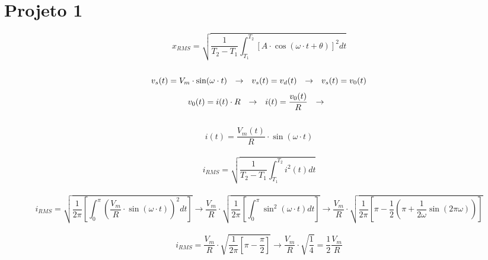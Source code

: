\documentclass{article}
\begin{document}
    \section{Projeto 1}
        \[
            x_{RMS} = \sqrt{\frac{1}{T_{2} - T_{1}} \int_{T_{1}}^{T_{2}} [A \cdot \cos(\omega\cdot t + \theta)]^{2} dt}
        \]\\
        \[
            v_{s}(t) = V_{m} \cdot \sin(\omega \cdot t) \hspace{2.5mm} \to \hspace{2.5mm}
            v_{s}(t) = v_{d}(t) \hspace{2.5mm} \to \hspace{2.5mm}
            v_{s}(t) = v_{0}(t)
        \]
        \[
            v_{0}(t) = i(t) \cdot R \hspace{2.5mm} \to \hspace{2.5mm}
            i(t) = \frac{v_{0}(t)}{R} \hspace{2.5mm} \to \hspace{2.5mm}
        \]\\
        \[
            \boxed{i(t) = \frac{V_{m}(t)}{R} \cdot \sin(\omega \cdot t)}
        \]\\
        \[
            i_{RMS} = \sqrt{\frac{1}{T_{2} - T_{1}} \int_{T_{1}}^{T_{2}} i^{2}(t) dt}
        \]\\
        \[
            i_{RMS} = 
                    \sqrt{ \frac{1}{2 \pi}
                        \left[
                            \int_{0}^{\pi} {
                                \left(
                                    \frac{V_{m}}{R} \cdot \sin(\omega \cdot t)
                                \right)}^{2} dt 
                        \right]
                    }
                    \to
                    \frac{V_{m}}{R} \cdot
                    \sqrt{ \frac{1}{2 \pi}
                        \left[
                            \int_{0}^{ \pi} {
                                \sin^{2}(\omega \cdot t)
                            } dt
                        \right]
                    }
                    \to
                    \frac{V_{m}}{R} \cdot
                    \sqrt{ \frac{1}{2 \pi}
                        \left[
                            \pi - \frac{1}{2}\left(\pi + \frac{1}{2 \omega} \sin(2 \pi \omega)\right)
                        \right]
                    }
        \]\\
        \[
            i_{RMS} = 
                    \frac{V_{m}}{R} \cdot
                    \sqrt{ \frac{1}{2 \pi}
                        \left[
                            \pi - \frac{\pi}{2}
                        \right]
                    }
                    \to 
                    \frac{V_{m}}{R} \cdot
                    \sqrt{
                        \frac{1}{4}
                    }
                    = 
                    \frac{1}{2}
                    \frac{V_{m}}{R}
        \]\\
\end{document}
